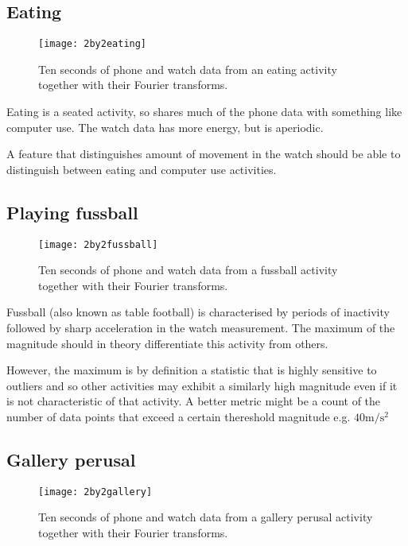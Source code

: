     \subsection{Eating}
      \begin{figure}[!th]
        \centering
        \texttt{[image: 2by2eating]}
        \caption{Ten seconds of phone and watch data from an eating activity together with their Fourier transforms.}
        \label{fig:2by2eating}
      \end{figure}
      
      Eating is a seated activity, so shares much of the phone data with something like computer use. The watch data has more energy, but is aperiodic.
      
      A feature that distinguishes amount of movement in the watch should be able to distinguish between eating and computer use activities.
    \pagebreak[4]
    \subsection{Playing fussball}
      \begin{figure}[!th]
        \centering
        \texttt{[image: 2by2fussball]}
        \caption{Ten seconds of phone and watch data from a fussball activity together with their Fourier transforms.}
        \label{fig:2by2fussball}
      \end{figure}
      
      Fussball (also known as table football) is characterised by periods of inactivity followed by sharp acceleration in the watch measurement. The maximum of the magnitude should in theory differentiate this activity from others.
      
      However, the maximum is by definition a statistic that is highly sensitive to outliers and so other activities may exhibit a similarly high magnitude even if it is not characteristic of that activity. A better metric might be a count of the number of data points that exceed a certain thereshold magnitude e.g. $40 \si{\metre\per\square\second}$ 
    \pagebreak[4]
    \subsection{Gallery perusal}
      \begin{figure}[!th]
        \centering
        \texttt{[image: 2by2gallery]}
        \caption{Ten seconds of phone and watch data from a gallery perusal activity together with their Fourier transforms.}
        \label{fig:2by2gallery}
      \end{figure}
      
